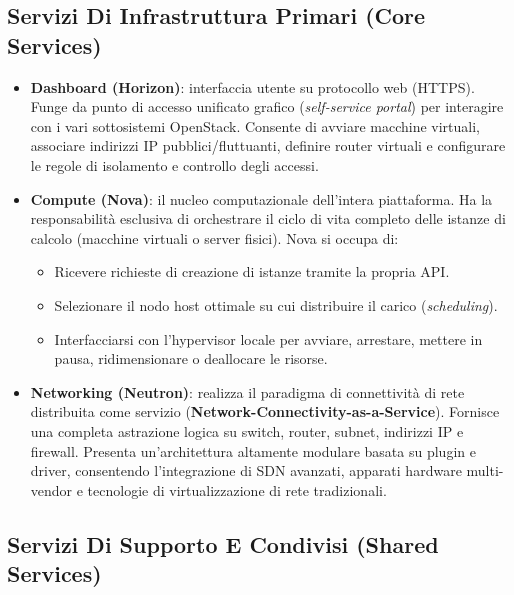 \documentclass[11pt, a4paper]{article}
\begin{document}
\subsection{Servizi Di Infrastruttura Primari (Core Services)}

\begin{itemize}
    \item \textbf{Dashboard (Horizon)}: interfaccia utente su protocollo web (HTTPS). Funge da punto di accesso unificato grafico (\emph{self-service portal}) per interagire con i vari sottosistemi OpenStack. Consente di avviare macchine virtuali, associare indirizzi IP pubblici/fluttuanti, definire router virtuali e configurare le regole di isolamento e controllo degli accessi.
    \item \textbf{Compute (Nova)}: il nucleo computazionale dell'intera piattaforma. Ha la responsabilità esclusiva di orchestrare il ciclo di vita completo delle istanze di calcolo (macchine virtuali o server fisici). Nova si occupa di:
    \begin{itemize}[noitemsep]
        \item Ricevere richieste di creazione di istanze tramite la propria API.
        \item Selezionare il nodo host ottimale su cui distribuire il carico (\emph{scheduling}).
        \item Interfacciarsi con l'hypervisor locale per avviare, arrestare, mettere in pausa, ridimensionare o deallocare le risorse.
    \end{itemize}
    \item \textbf{Networking (Neutron)}: realizza il paradigma di connettività di rete distribuita come servizio (\textbf{Network-Connectivity-as-a-Service}). Fornisce una completa astrazione logica su switch, router, subnet, indirizzi IP e firewall. Presenta un'architettura altamente modulare basata su plugin e driver, consentendo l'integrazione di SDN avanzati, apparati hardware multi-vendor e tecnologie di virtualizzazione di rete tradizionali.
\end{itemize}

\subsection{Servizi Di Supporto E Condivisi (Shared Services)}
\end{document}
